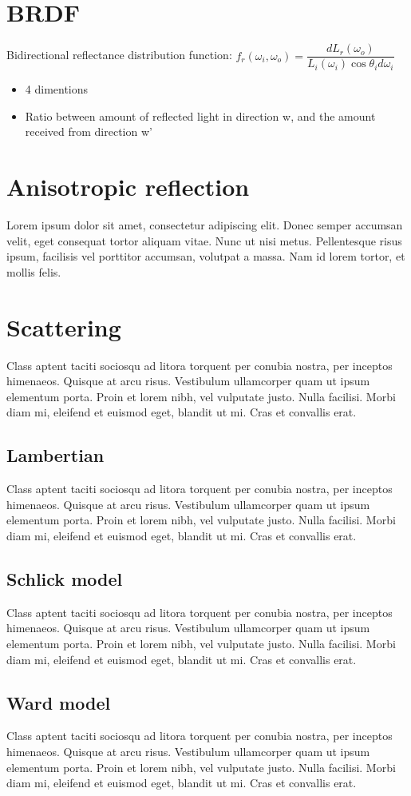 \section{BRDF}
Bidirectional reflectance distribution function:
$f_r(\omega_i, \omega_o) = \dfrac{dL_r(\omega_o)}{L_i(\omega_i)\cos{\theta_i}d\omega_i}$
\begin{itemize}
\item 4 dimentions
\item Ratio between amount of reflected light in direction w, and the amount received from direction w' 
\end{itemize}
\section{Anisotropic reflection}
Lorem ipsum dolor sit amet, consectetur adipiscing elit. Donec semper accumsan velit, eget consequat tortor aliquam vitae. Nunc ut nisi metus. Pellentesque risus ipsum, facilisis vel porttitor accumsan, volutpat a massa. Nam id lorem tortor, et mollis felis.
\section{Scattering}
Class aptent taciti sociosqu ad litora torquent per conubia nostra, per inceptos himenaeos. Quisque at arcu risus. Vestibulum ullamcorper quam ut ipsum elementum porta. Proin et lorem nibh, vel vulputate justo. Nulla facilisi. Morbi diam mi, eleifend et euismod eget, blandit ut mi. Cras et convallis erat. 
\subsection{Lambertian}
Class aptent taciti sociosqu ad litora torquent per conubia nostra, per inceptos himenaeos. Quisque at arcu risus. Vestibulum ullamcorper quam ut ipsum elementum porta. Proin et lorem nibh, vel vulputate justo. Nulla facilisi. Morbi diam mi, eleifend et euismod eget, blandit ut mi. Cras et convallis erat. 
\subsection{Schlick model}
Class aptent taciti sociosqu ad litora torquent per conubia nostra, per inceptos himenaeos. Quisque at arcu risus. Vestibulum ullamcorper quam ut ipsum elementum porta. Proin et lorem nibh, vel vulputate justo. Nulla facilisi. Morbi diam mi, eleifend et euismod eget, blandit ut mi. Cras et convallis erat. 
\subsection{Ward model}
Class aptent taciti sociosqu ad litora torquent per conubia nostra, per inceptos himenaeos. Quisque at arcu risus. Vestibulum ullamcorper quam ut ipsum elementum porta. Proin et lorem nibh, vel vulputate justo. Nulla facilisi. Morbi diam mi, eleifend et euismod eget, blandit ut mi. Cras et convallis erat. 
